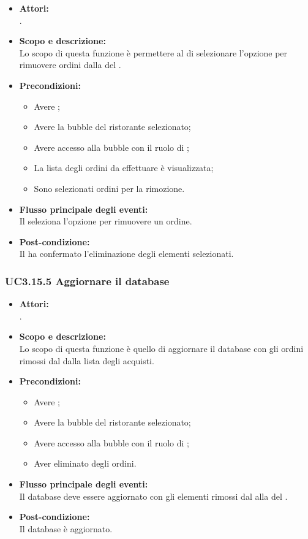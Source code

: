 \begin{itemize}
	\item \textbf{Attori:}
	\\.
	\item \textbf{Scopo e descrizione:} 
	\\Lo scopo di questa funzione è permettere al  di selezionare l’opzione per rimuovere ordini dalla  del .
	\item \textbf{Precondizioni:}
	\begin{itemize}
		\item Avere ;
		\item Avere la bubble del ristorante selezionato;
		\item Avere accesso alla bubble con il ruolo di ;
		\item La lista degli ordini da effettuare è visualizzata;
		\item Sono selezionati ordini per la rimozione.
	\end{itemize}
	\item \textbf{Flusso principale degli eventi:}
	\\Il {} seleziona l’opzione per rimuovere un ordine.
	\item \textbf{Post-condizione:}
	\\Il {} ha confermato l'eliminazione degli elementi selezionati.
\end{itemize}

\subsubsection{UC3.15.5 Aggiornare il database} \label{UC3.15.5}

\begin{itemize}
	\item \textbf{Attori:}
	\\.
	\item \textbf{Scopo e descrizione:} 
	\\Lo scopo di questa funzione è quello di aggiornare il database con gli ordini rimossi dal  dalla lista degli acquisti.
	\item \textbf{Precondizioni:}
	\begin{itemize}
		\item Avere ;
		\item Avere la bubble del ristorante selezionato;
		\item Avere accesso alla bubble con il ruolo di ;
		\item Aver eliminato degli ordini.
	\end{itemize}
	\item \textbf{Flusso principale degli eventi:}
	\\Il database deve essere aggiornato con gli elementi rimossi dal  alla  del .
	\item \textbf{Post-condizione:}
	\\Il database è aggiornato.
\end{itemize}
